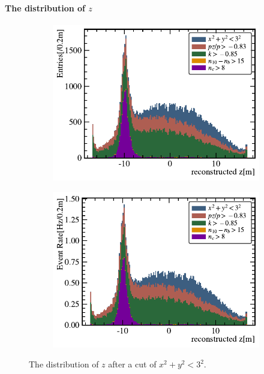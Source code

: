 \paragraph{The distribution of $z$}
\begin{figure}[!htbp]
	\centering
	\begin{subfigure}{0.4\textwidth}
		\includegraphics[width=\textwidth]{neutrontag/lb/3671_z.pdf}
		\caption{}
		\label{lb:sNsNb}
	\end{subfigure}

	\begin{subfigure}{0.4\textwidth}
		\includegraphics[width=\textwidth]{neutrontag/lb/3671_z_rate.pdf}
		\caption{}
		\label{lb:sSN}
	\end{subfigure}
	\caption{The distribution of $z$ after a cut of $x^2+y^2<3^2$.}
	\label{lb:ssummary}
\end{figure}

